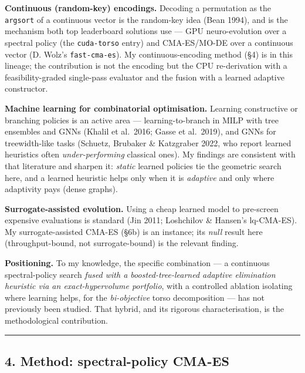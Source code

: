 \documentclass[
  11pt,
]{article}
\begin{document}
\textbf{Continuous (random-key) encodings.} Decoding a permutation as
the \texttt{argsort} of a continuous vector is the random-key idea (Bean
1994), and is the mechanism both top leaderboard solutions use --- GPU
neuro-evolution over a spectral policy (the \texttt{cuda-torso} entry)
and CMA-ES/MO-DE over a continuous vector (D. Wolz's
\texttt{fast-cma-es}). My continuous-encoding method (§4) is in this
lineage; the contribution is not the encoding but the CPU re-derivation
with a feasibility-graded single-pass evaluator and the fusion with a
learned adaptive constructor.

\textbf{Machine learning for combinatorial optimisation.} Learning
constructive or branching policies is an active area ---
learning-to-branch in MILP with tree ensembles and GNNs (Khalil et
al.~2016; Gasse et al.~2019), and GNNs for treewidth-like tasks
(Schuetz, Brubaker \& Katzgraber 2022, who report learned heuristics
often \emph{under-performing} classical ones). My findings are
consistent with that literature and sharpen it: \emph{static} learned
policies tie the geometric search here, and a learned heuristic helps
only when it is \emph{adaptive} and only where adaptivity pays (dense
graphs).

\textbf{Surrogate-assisted evolution.} Using a cheap learned model to
pre-screen expensive evaluations is standard (Jin 2011; Loshchilov \&
Hansen's lq-CMA-ES). My surrogate-assisted CMA-ES (§6b) is an instance;
its \emph{null} result here (throughput-bound, not surrogate-bound) is
the relevant finding.

\textbf{Positioning.} To my knowledge, the specific combination --- a
continuous spectral-policy search \emph{fused with a
boosted-tree-learned adaptive elimination heuristic via an
exact-hypervolume portfolio}, with a controlled ablation isolating where
learning helps, for the \emph{bi-objective} torso decomposition --- has
not previously been studied. That hybrid, and its rigorous
characterisation, is the methodological contribution.

\begin{center}\rule{0.5\linewidth}{0.5pt}\end{center}

\hypertarget{method-spectral-policy-cma-es}{%
\subsection{4. Method: spectral-policy
CMA-ES}\label{method-spectral-policy-cma-es}}
\end{document}
